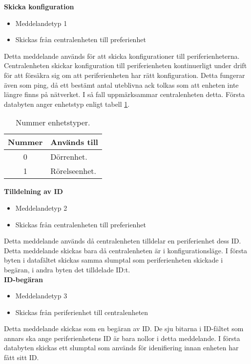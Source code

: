 \textbf{Skicka konfiguration}
\begin{itemize}
    \item Meddelandetyp 1
    \item Skickas från centralenheten till preferienhet
\end{itemize}
Detta meddelande används för att skicka konfigurationer till periferienheterna.
Centralenheten skickar konfiguration till periferienheten kontinuerligt under drift för att försäkra sig om att periferienheten har rätt konfiguration. Detta fungerar även som ping, då ett bestämt antal uteblivna ack tolkas som att enheten inte längre finns på nätverket.
I så fall uppmärksammar centralenheten detta.
Första databyten anger enhetstyp enligt tabell \ref{tab:enhetstyper}.
\begin{table}
	\centering
	\begin{tabular}{|c|p{}|}
		\hline
		Nummer & Används till \\ \hline \hline
		0 & Dörrenhet. \\ \hline
		1 & Rörelseenhet. \\ \hline

	\end{tabular}
	\caption{Nummer enhetstyper.}
	\label{tab:enhetstyper}
\end{table}


\textbf{Tilldelning av ID}
\begin{itemize}
    \item Meddelandetyp 2
    \item Skickas från centralenheten till preferienhet
\end{itemize}
Detta meddelande används då centralenheten tilldelar en periferienhet dess ID. Detta meddelande skickas bara då centralenheten är i konfigurationsläge. I första byten i datafältet skickas samma slumptal som periferienheten skickade i begäran, i andra byten det tilldelade ID:t. \\


\textbf{ID-begäran}
\begin{itemize}
    \item Meddelandetyp 3
    \item Skickas från periferienhet till centralenheten
\end{itemize}
Detta meddelande skickas som en begäran av ID. De sju bitarna i ID-fältet som annars ska ange periferienhetens ID är bara nollor i detta meddelande. I första databyten skickas ett slumptal som används för idenifiering innan enheten har fått sitt ID.
